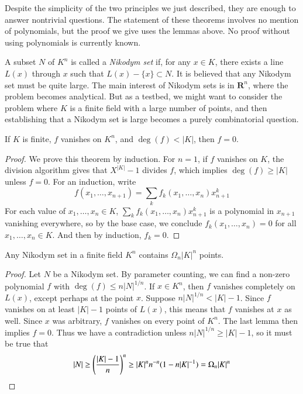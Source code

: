 Despite the simplicity of the two principles we just described, they are enough to answer nontrivial questions. The statement of these theorems involves no mention of polynomials, but the proof we give uses the lemmas above. No proof without using polynomials is currently known.

A subset $N$ of $K^n$ is called a {\it Nikodym set} if, for any $x \in K$, there exists a line $L(x)$ through $x$ such that $L(x) - \{ x \} \subset N$. It is believed that any Nikodym set must be quite large. The main interest of Nikodym sets is in $\mathbf{R}^n$, where the problem becomes analytical. But as a testbed, we might want to consider the problem where $K$ is a finite field with a large number of points, and then establishing that a Nikodym set is large becomes a purely combinatorial question.

\begin{lemma}
	If $K$ is finite, $f$ vanishes on $K^n$, and $\deg(f) < |K|$, then $f = 0$.
\end{lemma}
\begin{proof}
	We prove this theorem by induction. For $n = 1$, if $f$ vanishes on $K$, the division algorithm gives that $X^{|K|} - 1$ divides $f$, which implies $\deg(f) \geq |K|$ unless $f = 0$. For an induction, write
	\[ f(x_1, \dots, x_{n+1}) = \sum_k f_k(x_1, \dots, x_n) x_{n+1}^k  \]
	For each value of $x_1, \dots, x_n \in K$, $\sum_k f_k(x_1, \dots, x_n) x_{n+1}^k$ is a polynomial in $x_{n+1}$ vanishing everywhere, so by the base case, we conclude $f_k(x_1, \dots, x_n) = 0$ for all $x_1, \dots, x_n \in K$. And then by induction, $f_k = 0$.
\end{proof}

\begin{theorem}
	Any Nikodym set in a finite field $K^n$ contains $\Omega_n |K|^n$ points.
\end{theorem}
\begin{proof}
	Let $N$ be a Nikodym set. By parameter counting, we can find a non-zero polynomial $f$ with $\deg(f) \leq n |N|^{1/n}$. If $x \in K^n$, then $f$ vanishes completely on $L(x)$, except perhaps at the point $x$. Suppose $n |N|^{1/n} < |K| - 1$. Since $f$ vanishes on at least $|K| - 1$ points of $L(x)$, this means that $f$ vanishes at $x$ as well. Since $x$ was arbitrary, $f$ vanishes on every point of $K^n$. The last lemma then implies $f = 0$. Thus we have a contradiction unless $n |N|^{1/n} \geq |K| - 1$, so it must be true that
	\[ |N| \geq \left( \frac{|K| - 1}{n} \right)^n \geq |K|^n n^{-n} (1 - n|K|^{-1}) = \Omega_n |K|^n \qedhere \]
\end{proof}

